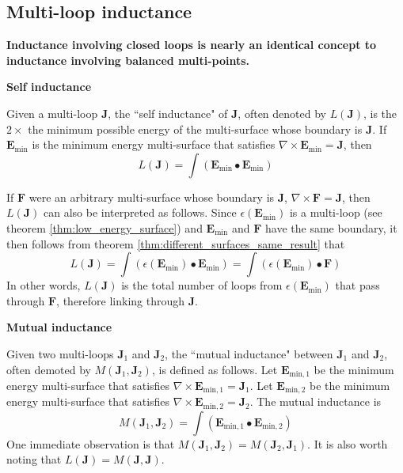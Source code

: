 \subsection{Multi-loop inductance}

{\bf Inductance involving closed loops is nearly an identical concept to inductance involving balanced multi-points.} 

\vspace{5mm}

\textbf{Self inductance}

Given a multi-loop \(\mathbf{J}\), the ``self inductance" of \(\mathbf{J}\), often denoted by \(L(\mathbf{J})\), is the \(2 \times\) the minimum possible energy of the multi-surface whose boundary is \(\mathbf{J}\). If \(\mathbf{E}_{\text{min}}\) is the minimum energy multi-surface that satisfies \(\nabla \times \mathbf{E}_{\text{min}} = \mathbf{J}\), then 
\[L(\mathbf{J}) = \int (\mathbf{E}_{\text{min}} \bullet \mathbf{E}_{\text{min}})\]  

If \(\mathbf{F}\) were an arbitrary multi-surface whose boundary is \(\mathbf{J}\), \(\nabla \times \mathbf{F} = \mathbf{J}\), then \(L(\mathbf{J})\) can also be interpreted as follows. Since \(\epsilon(\mathbf{E}_{\text{min}})\) is a multi-loop (see theorem \ref{thm:low_energy_surface}) and \(\mathbf{E}_{\text{min}}\) and \(\mathbf{F}\) have the same boundary, it then follows from theorem \ref{thm:different_surfaces_same_result} that 
\[L(\mathbf{J}) = \int (\epsilon(\mathbf{E}_{\text{min}}) \bullet \mathbf{E}_{\text{min}}) = \int (\epsilon(\mathbf{E}_{\text{min}}) \bullet \mathbf{F})\]
In other words, \(L(\mathbf{J})\) is the total number of loops from \(\epsilon(\mathbf{E}_{\text{min}})\) that pass through \(\mathbf{F}\), therefore linking through \(\mathbf{J}\).

\vspace{5mm}

\textbf{Mutual inductance}

Given two multi-loops \(\mathbf{J}_1\) and \(\mathbf{J}_2\), the ``mutual inductance" between \(\mathbf{J}_1\) and \(\mathbf{J}_2\), often demoted by \(M(\mathbf{J}_1, \mathbf{J}_2)\), is defined as follows. 
Let \(\mathbf{E}_{\text{min},1}\) be the minimum energy multi-surface that satisfies \(\nabla \times \mathbf{E}_{\text{min},1} = \mathbf{J}_1\).
Let \(\mathbf{E}_{\text{min},2}\) be the minimum energy multi-surface that satisfies \(\nabla \times \mathbf{E}_{\text{min},2} = \mathbf{J}_2\). 
The mutual inductance is 
\[M(\mathbf{J}_1, \mathbf{J}_2) = \int (\mathbf{E}_{\text{min},1} \bullet \mathbf{E}_{\text{min},2})\]
One immediate observation is that \(M(\mathbf{J}_1, \mathbf{J}_2) = M(\mathbf{J}_2, \mathbf{J}_1)\). It is also worth noting that \(L(\mathbf{J}) = M(\mathbf{J},\mathbf{J})\).

